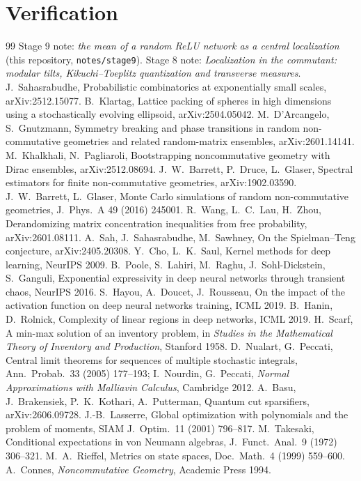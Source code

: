 \documentclass[11pt]{article}
\theoremstyle{plain}
\theoremstyle{definition}\newtheorem{definition}[theorem]{Definition}\newtheorem{remark}[theorem]{Remark}
\begin{document}
\section*{Verification}

\begin{thebibliography}{99}\small
{} Stage 9 note: \emph{the mean of a random ReLU network as a central localization} (this repository, \texttt{notes/stage9}).
 Stage 8 note: \emph{Localization in the commutant: modular tilts, Kikuchi--Toeplitz quantization and transverse measures}.
 J.~Sahasrabudhe, Probabilistic combinatorics at exponentially small scales, arXiv:2512.15077.
 B.~Klartag, Lattice packing of spheres in high dimensions using a stochastically evolving ellipsoid, arXiv:2504.05042.
 M.~D'Arcangelo, S.~Gnutzmann, Symmetry breaking and phase transitions in random non-commutative geometries and related random-matrix ensembles, arXiv:2601.14141.
 M.~Khalkhali, N.~Pagliaroli, Bootstrapping noncommutative geometry with Dirac ensembles, arXiv:2512.08694.
 J.~W.~Barrett, P.~Druce, L.~Glaser, Spectral estimators for finite non-commutative geometries, arXiv:1902.03590.
 J.~W.~Barrett, L.~Glaser, Monte Carlo simulations of random non-commutative geometries, J.~Phys.~A 49 (2016) 245001.
 R.~Wang, L.~C.~Lau, H.~Zhou, Derandomizing matrix concentration inequalities from free probability, arXiv:2601.08111.
 A.~Sah, J.~Sahasrabudhe, M.~Sawhney, On the Spielman--Teng conjecture, arXiv:2405.20308.
 Y.~Cho, L.~K.~Saul, Kernel methods for deep learning, NeurIPS 2009.
 B.~Poole, S.~Lahiri, M.~Raghu, J.~Sohl-Dickstein, S.~Ganguli, Exponential expressivity in deep neural networks through transient chaos, NeurIPS 2016.
 S.~Hayou, A.~Doucet, J.~Rousseau, On the impact of the activation function on deep neural networks training, ICML 2019.
 B.~Hanin, D.~Rolnick, Complexity of linear regions in deep networks, ICML 2019.
 H.~Scarf, A min-max solution of an inventory problem, in \emph{Studies in the Mathematical Theory of Inventory and Production}, Stanford 1958.
 D.~Nualart, G.~Peccati, Central limit theorems for sequences of multiple stochastic integrals, Ann.~Probab.~33 (2005) 177--193; I.~Nourdin, G.~Peccati, \emph{Normal Approximations with Malliavin Calculus}, Cambridge 2012.
 A.~Basu, J.~Brakensiek, P.~K.~Kothari, A.~Putterman, Quantum cut sparsifiers, arXiv:2606.09728.
 J.-B.~Lasserre, Global optimization with polynomials and the problem of moments, SIAM J.~Optim.~11 (2001) 796--817.
 M.~Takesaki, Conditional expectations in von Neumann algebras, J.~Funct.~Anal.~9 (1972) 306--321.
 M.~A.~Rieffel, Metrics on state spaces, Doc.~Math.~4 (1999) 559--600.
 A.~Connes, \emph{Noncommutative Geometry}, Academic Press 1994.
\end{thebibliography}
\end{document}
